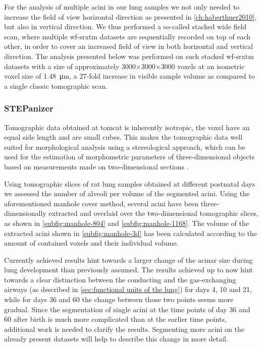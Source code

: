 For the analysis of multiple acini in our lung samples we not only needed to increase the field of view horizontal direction as presented in \autoref{ch:haberthuer2010}, but also in vertical direction. We thus performed a so-called stacked wide field scan, where multiple \ac{wf-srxtm} datasets are sequentially recorded on top of each other, in order to cover an increased field of view in both horizontal and vertical direction. The analysis presented below was performed on such stacked \ac{wf-srxtm} datasets with a size of approximately 3000$\times$3000$\times$3000 voxels at an isometric voxel size of \SI{1.48}{\micro\meter}, \ie a 27-fold increase in visible sample volume as compared to a single classic tomographic scan.

\subsubsection{STEPanizer}\label{sec:stepanizer}
Tomographic data obtained at \ac{tomcat} is inherently isotropic, \ie the voxel have an equal side length and are small cubes. This makes the tomographic data well suited for morphological analysis using a stereological approach, which can be used for the estimation of morphometric parameters of three-dimensional objects based
on measurements made on two-dimensional sections \cite{Vanhecke2007}.

Using tomographic slices of rat lung samples obtained at different postnatal days we assessed the number of alveoli per volume of the segmented acini. Using the aforementioned manhole cover method, several acini have been three-dimensionally extracted and overlaid over the two-dimensional tomographic slices, as shown in \autoref{subfig:manhole-804} and \ref{subfig:manhole-1168}. The volume of the extracted acini shown in \autoref{subfig:manhole-3d} has been calculated according to the amount of contained voxels and their individual volume.

Currently achieved results hint towards a larger change of the acinar size during lung development than previously assumed. The results achieved up to now hint towards a clear distinction between the conducting and the gas-exchanging airways (as described in \autoref{sec:functional units of the lung}) for days 4, 10 and 21, while for days 36 and 60 the change between those two points seems more gradual. Since the segmentation of single acini at the time points of day 36 and 60 after birth is much more complicated than at the earlier time points, additional work is needed to clarify the results. Segmenting more acini on the already present datasets will help to describe this change in more detail.

